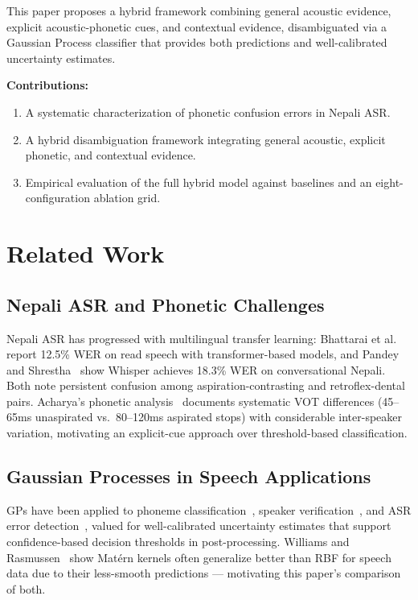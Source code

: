 \documentclass[10pt,conference]{IEEEtran}
\begin{document}
This paper proposes a hybrid framework combining general acoustic
evidence, explicit acoustic-phonetic cues, and contextual evidence,
disambiguated via a Gaussian Process classifier that provides both
predictions and well-calibrated uncertainty estimates.

\textbf{Contributions:}
\begin{enumerate}
  \item A systematic characterization of phonetic confusion errors in
        Nepali ASR.
  \item A hybrid disambiguation framework integrating general acoustic,
        explicit phonetic, and contextual evidence.
  \item Empirical evaluation of the full hybrid model against baselines
        and an eight-configuration ablation grid.
\end{enumerate}

\section{Related Work}

\subsection{Nepali ASR and Phonetic Challenges}
Nepali ASR has progressed with multilingual transfer learning:
Bhattarai et al.~\cite{bhattarai2022nepali} report 12.5\% WER on read
speech with transformer-based models, and Pandey and
Shrestha~\cite{pandey2023whisper} show Whisper achieves 18.3\% WER on
conversational Nepali. Both note persistent confusion among
aspiration-contrasting and retroflex-dental pairs. Acharya's phonetic
analysis~\cite{acharya2020nepali} documents systematic VOT differences
(45--65ms unaspirated vs.\ 80--120ms aspirated stops) with considerable
inter-speaker variation, motivating an explicit-cue approach over
threshold-based classification.

\subsection{Gaussian Processes in Speech Applications}
GPs have been applied to phoneme classification~\cite{linderman2010gp},
speaker verification~\cite{kim2014gp}, and ASR error
detection~\cite{zhao2021gp}, valued for well-calibrated uncertainty
estimates that support confidence-based decision thresholds in
post-processing. Williams and Rasmussen~\cite{rasmussen2006gp} show
Mat\'ern kernels often generalize better than RBF for speech data due to
their less-smooth predictions --- motivating this paper's comparison of
both.
\end{document}
